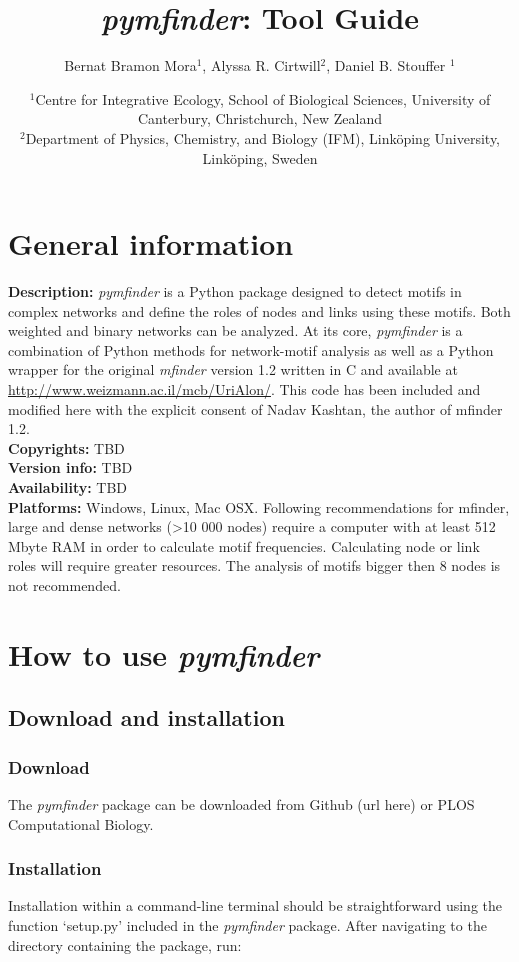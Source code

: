 \documentclass[12pt]{article}
\title{\emph{pymfinder}: Tool Guide}
\author{Bernat Bramon Mora$^{1}$, Alyssa R. Cirtwill$^{2}$, Daniel B. Stouffer $^{1}$}
\date{\small
$^1$Centre for Integrative Ecology, School of Biological Sciences, University of Canterbury, Christchurch, New Zealand\\
\medskip
$^2$Department of Physics, Chemistry, and Biology (IFM), Link\"{o}ping University, Link\"{o}ping, Sweden\\ }
\begin{document}
 
\maketitle 
\raggedright
\setlength{\parindent}{15pt} 

\newpage

\setlength{\parindent}{0cm}
\setlength{\parskip}{1em}

\section{General information}
	\textbf{Description:} \textit{pymfinder} is a Python package designed to detect motifs in complex networks and define the roles of nodes and links using these motifs. Both weighted and binary networks can be analyzed. At its core, \emph{pymfinder} is a combination of Python methods for network-motif analysis as well as a Python wrapper for the original \emph{mfinder} version 1.2 written in C and available at \url{http://www.weizmann.ac.il/mcb/UriAlon/}. This code has been included and modified here with the explicit consent of Nadav Kashtan, the author of mfinder 1.2.\\
	\textbf{Copyrights:} TBD\\
	\textbf{Version info:} TBD\\
	\textbf{Availability:} TBD\\
	\textbf{Platforms:} Windows, Linux, Mac OSX. Following recommendations for mfinder, large and dense networks (\textgreater10 000 nodes) require a computer with at least 512 Mbyte RAM in order to calculate motif frequencies. Calculating node or link roles will require greater resources. The analysis of motifs bigger then 8 nodes is not recommended.

\section{How to use \emph{pymfinder}}
	\subsection{Download and installation}
		\subsubsection{Download}
			The \emph{pymfinder} package can be downloaded from Github (url here) or PLOS Computational Biology.
		\subsubsection{Installation}
			Installation within a command-line terminal should be straightforward using the function `setup.py' included in the \emph{pymfinder} package. After navigating to the directory containing the package, run:
\end{document}
